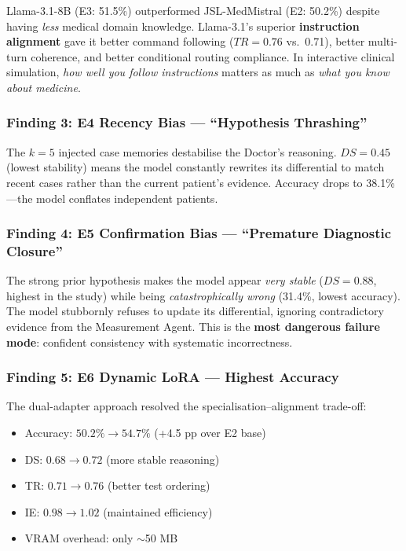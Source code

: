 Llama-3.1-8B (E3: 51.5\%) outperformed JSL-MedMistral (E2: 50.2\%) despite having \textit{less} medical domain knowledge. Llama-3.1's superior \textbf{instruction alignment} gave it better command following ($TR = 0.76$ vs.\ 0.71), better multi-turn coherence, and better conditional routing compliance. In interactive clinical simulation, \textit{how well you follow instructions} matters as much as \textit{what you know about medicine}.

\subsubsection{Finding 3: E4 Recency Bias --- ``Hypothesis Thrashing''}

The $k = 5$ injected case memories destabilise the Doctor's reasoning. $DS = 0.45$ (lowest stability) means the model constantly rewrites its differential to match recent cases rather than the current patient's evidence. Accuracy drops to 38.1\%---the model conflates independent patients.

\subsubsection{Finding 4: E5 Confirmation Bias --- ``Premature Diagnostic Closure''}

The strong prior hypothesis makes the model appear \textit{very stable} ($DS = 0.88$, highest in the study) while being \textit{catastrophically wrong} (31.4\%, lowest accuracy). The model stubbornly refuses to update its differential, ignoring contradictory evidence from the Measurement Agent. This is the \textbf{most dangerous failure mode}: confident consistency with systematic incorrectness.

\subsubsection{Finding 5: E6 Dynamic LoRA --- Highest Accuracy}

The dual-adapter approach resolved the specialisation--alignment trade-off:
\begin{itemize}
    \item Accuracy: $50.2\% \rightarrow 54.7\%$ (+4.5 pp over E2 base)
    \item DS: $0.68 \rightarrow 0.72$ (more stable reasoning)
    \item TR: $0.71 \rightarrow 0.76$ (better test ordering)
    \item IE: $0.98 \rightarrow 1.02$ (maintained efficiency)
    \item VRAM overhead: only $\sim$50 MB
\end{itemize}


